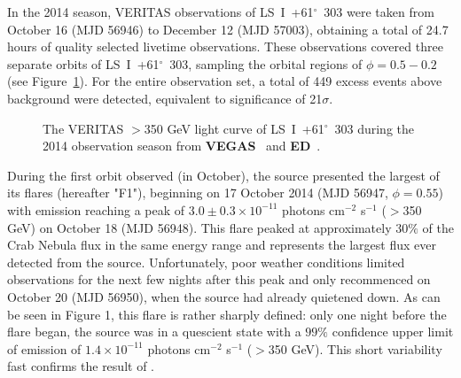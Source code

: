 \documentclass[preprint2]{aastex}
\newcommand{\pflux}{photons cm$^{-2}$ s$^{-1}$}
\newcommand{\lsi}{LS~I~+61$^{\circ}$~303}
\begin{document}
In the 2014 season, VERITAS observations of \lsi{} were taken from October 16 (MJD 56946) to  December 12 (MJD 57003), obtaining a total of 24.7 hours of quality selected livetime observations. These observations covered three separate orbits of \lsi{}, sampling the orbital regions of $\phi = 0.5-0.2$ (see Figure~\ref{f:fig1}). For the entire observation set, a total of 449 excess events above background were detected, equivalent to significance of 21$\sigma$.

\begin{figure}[ht]
\centering
{}
\caption{The VERITAS $>$350 GeV light curve of \lsi{} during the 2014 observation season from \textbf{VEGAS}~ and \textbf{ED}~.}
\label{f:fig1}
\end{figure}

During the first orbit observed (in October), the source presented the largest of its flares (hereafter "F1"), beginning on 17 October 2014 (MJD 56947, $\phi =  0.55$) with emission reaching a peak of $3.0 \pm 0.3 \times10^{-11}$ \pflux{} ($>$350 GeV) on October 18 (MJD 56948). This flare peaked at approximately $30\%$ of the Crab Nebula flux in the same energy range and represents the largest flux ever detected from the source. Unfortunately, poor weather conditions limited observations for the next few nights after this peak and only recommenced on October 20 (MJD 56950), when the source had already quietened down. As can be seen in Figure 1, this flare is rather sharply defined: only one night before the flare began, the source was in a quescient state with a $99\%$ confidence upper limit of emission of $1.4 \times10^{-11}$ \pflux{} ($>$350 GeV). This short variability fast confirms the result of \citep{2013ApJ...779...88A}.
\end{document}
